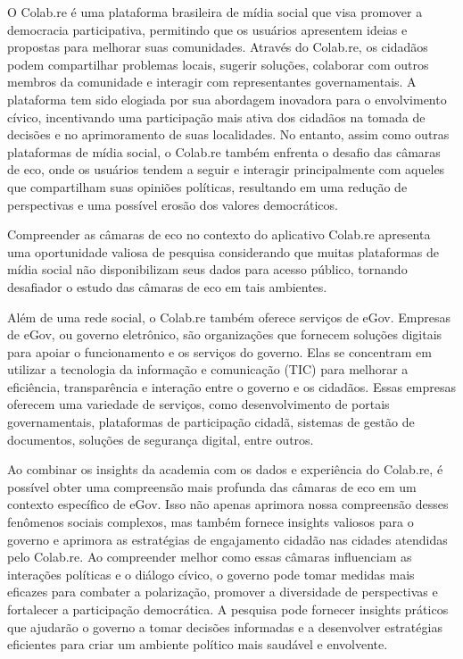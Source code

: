 O Colab.re é uma plataforma brasileira de mídia social que visa promover a democracia participativa, permitindo que os usuários apresentem ideias e propostas para melhorar suas comunidades. Através do Colab.re, os cidadãos podem compartilhar problemas locais, sugerir soluções, colaborar com outros membros da comunidade e interagir com representantes governamentais. A plataforma tem sido elogiada por sua abordagem inovadora para o envolvimento cívico, incentivando uma participação mais ativa dos cidadãos na tomada de decisões e no aprimoramento de suas localidades. No entanto, assim como outras plataformas de mídia social, o Colab.re também enfrenta o desafio das câmaras de eco, onde os usuários tendem a seguir e interagir principalmente com aqueles que compartilham suas opiniões políticas, resultando em uma redução de perspectivas e uma possível erosão dos valores democráticos.

Compreender as câmaras de eco no contexto do aplicativo Colab.re apresenta uma oportunidade valiosa de pesquisa considerando que muitas plataformas de mídia social não disponibilizam seus dados para acesso público, tornando desafiador o estudo das câmaras de eco em tais ambientes.

Além de uma rede social, o Colab.re também oferece serviços de eGov. Empresas de eGov, ou governo eletrônico, são organizações que fornecem soluções digitais para apoiar o funcionamento e os serviços do governo. Elas se concentram em utilizar a tecnologia da informação e comunicação (TIC) para melhorar a eficiência, transparência e interação entre o governo e os cidadãos. Essas empresas oferecem uma variedade de serviços, como desenvolvimento de portais governamentais, plataformas de participação cidadã, sistemas de gestão de documentos, soluções de segurança digital, entre outros.

Ao combinar os insights da academia com os dados e experiência do Colab.re, é possível obter uma compreensão mais profunda das câmaras de eco em um contexto específico de eGov. Isso não apenas aprimora nossa compreensão desses fenômenos sociais complexos, mas também fornece insights valiosos para o governo e aprimora as estratégias de engajamento cidadão nas cidades atendidas pelo Colab.re. Ao compreender melhor como essas câmaras influenciam as interações políticas e o diálogo cívico, o governo pode tomar medidas mais eficazes para combater a polarização, promover a diversidade de perspectivas e fortalecer a participação democrática. A pesquisa pode fornecer insights práticos que ajudarão o governo a tomar decisões informadas e a desenvolver estratégias eficientes para criar um ambiente político mais saudável e envolvente.

